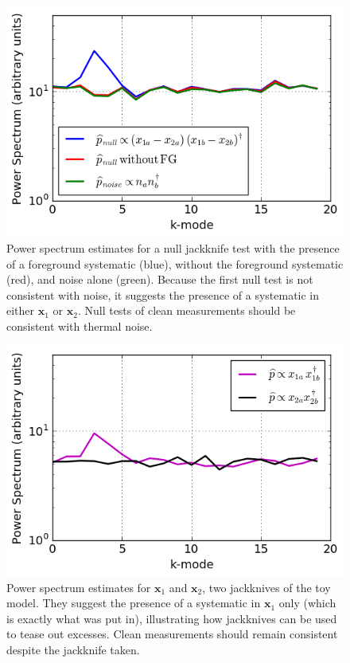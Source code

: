 \documentclass[preprint2,numberedappendix,tighten]{aastex6}  %
\begin{document}
\begin{figure}
	\centering
	\includegraphics[trim={0cm 0cm 0cm 0cm},width=\columnwidth]{plots/toy_bias1.png}
	\caption{Power spectrum estimates for a null jackknife test with the presence of a foreground systematic (blue), without 
the foreground systematic (red), and noise alone (green). Because the first null test is not consistent with noise, it suggests the 
presence of a systematic in either $\textbf{x}_{1}$ or $\textbf{x}_{2}$. Null tests of clean measurements should be consistent 
with thermal noise.}
	\label{fig:toy_bias1}
\end{figure}

\begin{figure}
	\centering
	\includegraphics[trim={0cm 0cm 0cm 0cm},width=\columnwidth]{plots/toy_bias2.png}
	\caption{Power spectrum estimates for $\textbf{x}_{1}$ and $\textbf{x}_{2}$, two jackknives of the toy model. They suggest 
the presence of a systematic in $\textbf{x}_{1}$ only (which is exactly what was put in), illustrating how jackknives can be used to tease out excesses. Clean 
measurements should remain consistent despite the jackknife taken.}
	\label{fig:toy_bias2}
\end{figure}
\end{document}

